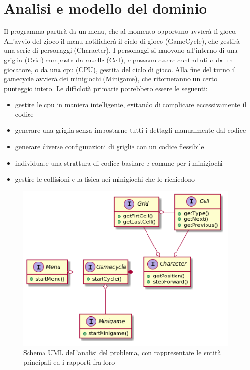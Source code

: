 \documentclass[a4paper,12pt]{report}
\begin{document}
	\section{Analisi e modello del dominio}

	Il programma partirà da un menu, che al momento opportuno avvierà il gioco.
	All'avvio del gioco il menu notificherà il ciclo di gioco (GameCycle), che gestirà una serie di personaggi (Character).
	I personaggi si muovono all'interno di una griglia (Grid) composta da caselle (Cell), e possono essere controllati o da un giocatore, o da una cpu (CPU), gestita del ciclo di gioco.
	Alla fine del turno il gamecycle avvierà dei minigiochi (Minigame), che ritorneranno un certo punteggio intero.
	Le difficlotà primarie potrebbero essere le seguenti:
	\begin{itemize}
		\item gestire le cpu in maniera intelligente, evitando di complicare eccessivamente il codice
		\item generare una griglia senza impostarne tutti i dettagli manualmente dal codice
		\item generare diverse configurazioni di griglie con un codice flessibile
		\item individuare una struttura di codice basilare e comune per i minigiochi
		\item gestire le collisioni e la fisica nei minigiochi che lo richiedono
	\end{itemize}

	\begin{figure}[!t]
		\centering{}
		\includegraphics{images/domain.png}
		\caption{Schema UML dell'analisi del problema, con rappresentate le entità principali ed i rapporti fra loro}
		\label{img:analysis}
	\end{figure}
\end{document}
